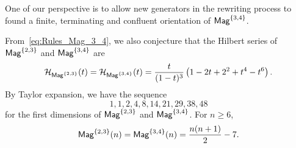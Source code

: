 One of our perspective is to allow new generators in the rewriting
process to found a finite, terminating and confluent
orientation of $\mathsf{Mag}^{\{3, 4\}}$.

From~\eqref{eq:Rules_Mag_3_4}, we also conjecture that the Hilbert
series of $\mathsf{Mag}^{\{2, 3\}}$ and $\mathsf{Mag}^{\{3, 4\}}$ are
\begin{equation}
    \mathcal{H}_{\mathsf{Mag}^{\{2, 3\}}}(t) =
    \mathcal{H}_{\mathsf{Mag}^{\{3, 4\}}}(t) =
    \frac{t}{(1 - t)^3}
    \left(1 - 2t + 2^2 + t^4 - t^6\right).
\end{equation}
By Taylor expansion, we have the sequence
\begin{equation}
    1, 1, 2, 4, 8, 14, 21, 29, 38, 48
\end{equation}
for the first dimensions of $\mathsf{Mag}^{\{2, 3\}}$ and $\mathsf{Mag}^{\{3, 4\}}$.
For $n \geq 6$, 
\begin{equation}
    \mathsf{Mag}^{\{2, 3\}}(n) =\mathsf{Mag}^{\{3, 4\}}(n) = \frac{n(n+1)}{2} - 7.
\end{equation}
\medbreak
